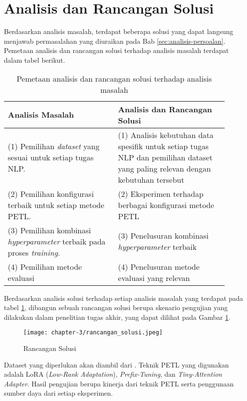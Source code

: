 \section{Analisis dan Rancangan Solusi}

Berdasarkan analisis masalah, terdapat beberapa solusi yang dapat langsung menjawab permasalahan yang diuraikan pada Bab \ref{sec:analisis-persoalan}. Pemetaan analisis dan rancangan solusi terhadap analisis masalah terdapat dalam tabel berikut.

\begin{table}[h!]
    \centering
    \begin{tabular}{|m{0.45\linewidth}|m{0.45\linewidth}|}
    \hline
    \rowcolor{black!10}
    \textbf{Analisis Masalah} & \textbf{Analisis dan Rancangan Solusi} \\ \hline
    (1) Pemilihan \textit{dataset} yang sesuai untuk setiap tugas NLP.& (1) Analisis kebutuhan data spesifik untuk setiap tugas NLP dan pemilihan dataset yang paling relevan dengan kebutuhan tersebut\\ \hline
    (2) Pemilihan konfigurasi terbaik untuk setiap metode PETL. & (2) Eksperimen terhadap berbagai konfigurasi metode PETL \\ \hline
    (3) Pemilihan kombinasi \textit{hyperparameter} terbaik pada proses \textit{training}. & (3) Penelusuran kombinasi \textit{hyperparameter} terbaik\\ \hline
    (4) Pemilihan metode evaluasi & (4) Penelusuran metode evaluasi yang relevan \\ \hline
    \end{tabular}
\caption{Pemetaan analisis dan rancangan solusi terhadap analisis masalah}
\label{table:pemetaan-masalah-solusi}
\end{table}

Berdasarkan analisis solusi terhadap setiap analisis masalah yang terdapat pada tabel \ref{table:pemetaan-masalah-solusi}, dibangun sebuah rancangan solusi berupa skenario pengujian yang dilakukan dalam penelitian tugas akhir, yang dapat dilihat pada Gambar \ref{fig:rancangan-solusi}.

\begin{figure}[ht]
    \centering
    \texttt{[image: chapter-3/rancangan\_solusi.jpeg]}
    \caption{Rancangan Solusi}
    \label{fig:rancangan-solusi}
\end{figure}

Dataset yang diperlukan akan diambil dari \cite{nusacatalogue}. Teknik PETL yang digunakan adalah LoRA (\textit{Low-Rank Adaptation}), \textit{Prefix-Tuning}, dan \textit{Tiny-Attention Adapter}. Hasil pengujian berupa kinerja dari teknik PETL serta penggunaan sumber daya dari setiap eksperimen.